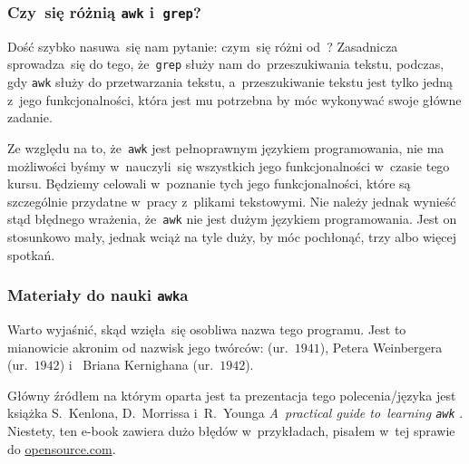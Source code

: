 \documentclass[10pt,t]{beamer}
\begin{document}
\begin{frame}
  \frametitle{Czy~się różnią \texttt{awk} i~\texttt{grep}?}


  Dość szybko nasuwa~się nam pytanie: czym~się różni
  od~?
  Zasadnicza sprowadza~się do tego, że~\texttt{grep} służy nam
  do~\alert{przeszukiwania} tekstu, podczas, gdy \texttt{awk} służy
  do \alert{przetwarzania} tekstu, a~przeszukiwanie tekstu jest tylko
  jedną z~jego funkcjonalności, która jest mu potrzebna by móc wykonywać
  swoje główne zadanie.

  Ze względu na to, że~\texttt{awk} jest pełnoprawnym językiem
  programowania, nie ma możliwości byśmy w~nauczyli~się wszystkich jego
  funkcjonalności w~czasie tego kursu. Będziemy celowali w~poznanie tych
  jego funkcjonalności, które są szczególnie przydatne w~pracy z~plikami
  tekstowymi. Nie należy jednak wynieść stąd błędnego wrażenia,
  że~\texttt{awk} nie jest dużym językiem programowania. Jest on
  stosunkowo mały, jednak wciąż na tyle duży, by móc pochłonąć, trzy albo
  więcej spotkań.

\end{frame}





\begin{frame}
  \frametitle{Materiały do nauki \texttt{awk}a}


  Warto wyjaśnić, skąd wzięła~się osobliwa nazwa tego programu. Jest to
  mianowicie akronim od nazwisk jego twórców:
  (ur.~$1941$),
  {Petera Weinbergera} (ur.~$1942$)
  i~
  {Briana Kernighana} (ur.~$1942$).

  Główny źródłem na którym oparta jest ta prezentacja tego polecenia/języka
  jest książka S.~Kenlona, D.~Morrissa i~R.~Younga
  {\textit{A~practical guide to~learning \texttt{awk}}}
  \parencite{Kenlon-Morriss-Young-A-practical-guide-to-learning-awk-Ver-2025}.
  Niestety, ten e-book zawiera dużo błędów w~przykładach, pisałem w~tej
  sprawie do \href{opensource.com}{opensource.com}.

\end{frame}
\end{document}
